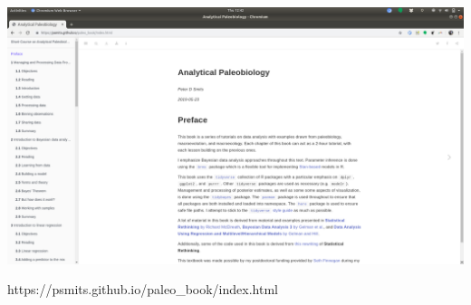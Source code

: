 \documentclass[aspectratio=169]{beamer}
\begin{document}
\begin{frame}

  \begin{center}
    \includegraphics[width=\textwidth,height=0.8\textheight,keepaspectratio=true]{figure/book}

    \Large{https://psmits.github.io/paleo\_book/index.html}
  \end{center}

\end{frame}
\end{document}
